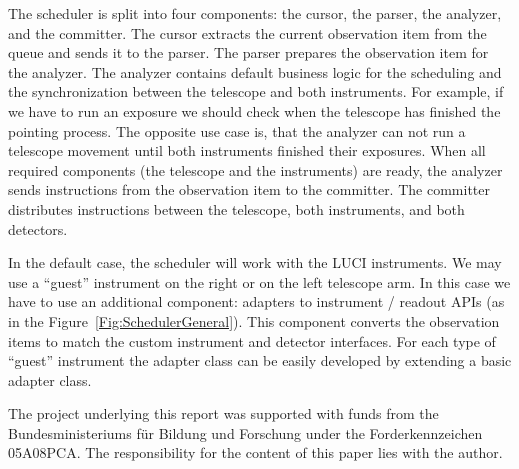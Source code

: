 The scheduler is split into four components: the cursor, the parser, the analyzer, and the committer. The cursor extracts the current observation item from the queue and sends it to the parser. The parser prepares the observation item for the analyzer. The analyzer contains default business logic for the scheduling and the synchronization between the telescope and both instruments. For example, if we have to run an exposure we should check when the telescope has finished the pointing process.  The opposite use case is, that the analyzer can not run a telescope movement until both instruments finished their exposures. When all required components (the telescope and the instruments) are ready, the analyzer sends instructions from the observation item to the committer. The committer distributes instructions between the telescope, both instruments, and both detectors.  

In the default case, the scheduler will work with the LUCI instruments. We may use a ``guest'' instrument on the right or on the left telescope arm. In this case we have to use an additional component: adapters to instrument / readout APIs (as in the Figure~\ref{Fig:SchedulerGeneral}). This component converts the observation items to match the custom instrument and detector interfaces. For each type of ``guest'' instrument the adapter class can be easily developed by extending a basic adapter class.

\acknowledgements 
The project underlying this report was supported with funds from the Bundesministeriums f\"ur Bildung und Forschung under the Forderkennzeichen 05A08PCA. The responsibility for the content of this paper lies with the author.


